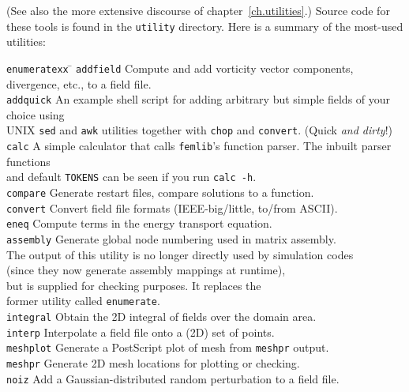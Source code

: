 \documentclass[11pt]{report}
\begin{document}
(See also the more extensive discourse of chapter~\ref{ch.utilities}.)
Source code for these tools is found in the \texttt{utility}
directory.  Here is a summary of the most-used utilities:
\begin{tabbing}
\texttt{enumeratexx}  \= \kill
\texttt{addfield} \> 
        Compute and add vorticity vector components, divergence, etc., to
        a field file.\\
\texttt{addquick} \> 
        An example shell script for adding arbitrary but simple fields
        of your choice using\\
        \> UNIX \verb|sed| and \verb|awk| utilities together with
        \verb|chop| and \verb|convert|. (Quick \emph{and dirty}!)\\
\texttt{calc} \>      
        A simple calculator that calls \verb+femlib+'s function
        parser. The inbuilt parser functions\\ \>and default \texttt{TOKENS}
        can be seen if you run \texttt{calc -h}.\\
\texttt{compare} \>   
        Generate restart files, compare solutions to a function.\\
\texttt{convert} \>   
        Convert field file formats (IEEE-big/little, to/from ASCII).\\
\texttt{eneq} \>   
        Compute terms in the energy transport equation.\\
\texttt{assembly}  \>
        Generate global node numbering used in matrix assembly.  \\
        \> The output of this utility is no longer directly used by
        simulation codes \\ 
        \> (since they now generate assembly mappings at runtime), \\
        but is supplied for checking purposes.  It replaces the \\
        \> former utility called \verb+enumerate+.\\
\texttt{integral} \>
        Obtain the 2D integral of fields over the
        domain area.\\
\texttt{interp} \>   
       Interpolate a field file onto a (2D) set of points.\\
\texttt{meshplot} \>
        Generate a PostScript plot of mesh from \texttt{meshpr} output.\\
\texttt{meshpr} \>    
        Generate 2D mesh locations for plotting or checking.\\
\texttt{noiz} \>      
        Add a Gaussian-distributed random perturbation to a field file.\\

\end{tabbing}
\end{document}
